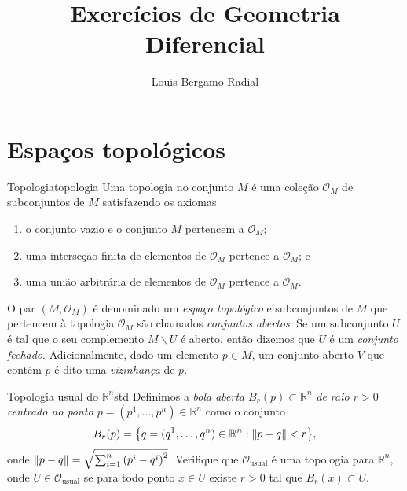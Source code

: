 \documentclass[12pt,a4paper]{article}
\title{Exercícios de Geometria Diferencial}
\author{Louis Bergamo Radial}
\numberwithin{equation}{section}
\DeclarePairedDelimiter\norm{\lVert}{\rVert}
\DeclarePairedDelimiter\set{\{}{\}}
\newcommand\topology[1]{\ensuremath{\left(#1, \mathcal{O}_{#1}\right)}}
\begin{document}
\maketitle


\section{Espaços topológicos}
\begin{definition}{Topologia}{topologia}
    Uma topologia no conjunto \(M\) é uma coleção \(\mathcal{O}_M\) de subconjuntos de \(M\) satisfazendo os axiomas
    \begin{enumerate}[label=(\alph*)]
        \item o conjunto vazio e o conjunto \(M\) pertencem a \(\mathcal{O}_M\);
        \item uma interseção finita de elementos de \(\mathcal{O}_M\) pertence a \(\mathcal{O}_M\); e
        \item uma união arbitrária de elementos de \(\mathcal{O}_M\) pertence a \(\mathcal{O}_M\).
    \end{enumerate}

    O par \topology{M} é denominado um \emph{espaço topológico} e subconjuntos de \(M\) que pertencem à topologia \(\mathcal{O}_M\) são chamados \emph{conjuntos abertos}. Se um subconjunto \(U\) é tal que o seu complemento \(M \smallsetminus U\) é aberto, então dizemos que \(U\) é um \emph{conjunto fechado}. Adicionalmente, dado um elemento \(p \in M\), um conjunto aberto \(V\) que contém \(p\) é dito uma \emph{vizinhança} de \(p\).
\end{definition}

\begin{exercício}{Topologia usual do \(\mathbb{R}^n\)}{std}
    Definimos a \emph{bola aberta} \(B_r(p) \subset \mathbb{R}^n\) \emph{de raio \(r > 0\) centrado no ponto \(p = (p^1, \dots, p^n) \in \mathbb{R}^n\)} como o conjunto
    \begin{equation*}
        B_r(p) = \set*{q = (q^1, \dots, q^n) \in \mathbb{R}^n : \norm{p - q} < r},
    \end{equation*}
    onde \(\norm{p - q} = \sqrt{\sum_{i=1}^n\left(p^i - q^i\right)^2}\). Verifique que \(\mathcal{O}_\mathrm{usual}\) é uma topologia para \(\mathbb{R}^n\), onde \(U \in \mathcal{O}_\mathrm{usual}\) se para todo ponto \(x \in U\) existe \(r > 0\) tal que \(B_r(x) \subset U\).
\end{exercício}
\end{document}
